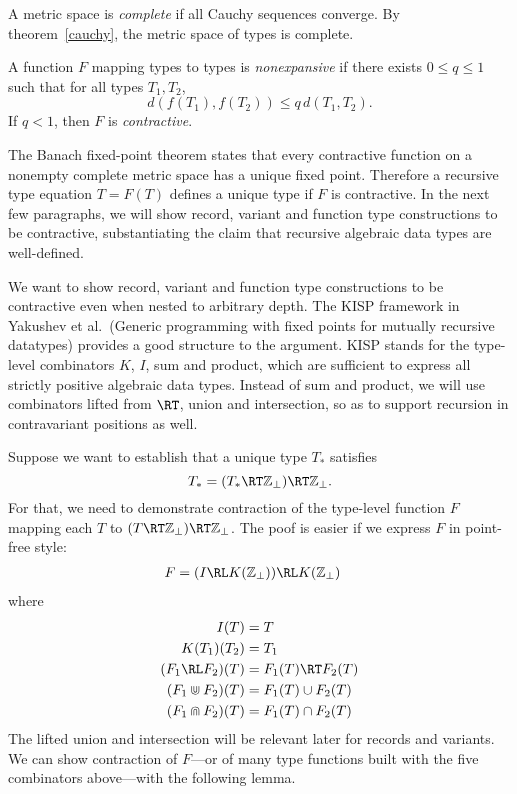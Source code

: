 \documentclass{amsart}
\begin{document}

A metric space is \emph{complete} if all Cauchy sequences
converge. By theorem~\ref{cauchy}, the metric space of types is
complete.

A function $F$ mapping types to types is \emph{nonexpansive} if
there exists $0\le q\le1$ such that for all types $T_1,T_2$,
\[
d(f(T_1), f(T_2)) \le q \, d(T_1, T_2).
\]
If $q<1$, then $F$ is \emph{contractive}.

The Banach fixed-point theorem states that every contractive
function on a nonempty complete metric space has a unique fixed
point. Therefore a recursive type equation $T=F(T)$ defines a
unique type if $F$ is contractive. In the next few paragraphs, we
will show record, variant and function type constructions to be
contractive, substantiating the claim that recursive algebraic
data types are well-defined.

\label{kisp}

We want to show record, variant and function type constructions
to be contractive even when nested to arbitrary depth. The KISP
framework in Yakushev et al.\ (Generic programming with fixed
points for mutually recursive datatypes) provides a good
structure to the argument. KISP stands for the type-level
combinators $K$, $I$, sum and product, which are sufficient to
express all strictly positive algebraic data types. Instead of
sum and product, we will use combinators lifted from $\RT$, union
and intersection, so as to support recursion in contravariant
positions as well.

Suppose we want to establish that a unique type $T_*$
satisfies
\[
T_*=(T_*\RT \mathbb Z_\bot)\RT \mathbb Z_\bot.
\]
For that, we need to demonstrate contraction of the type-level
function $F$ mapping each $T$ to $(T \RT \mathbb Z_\bot)\RT
\mathbb Z_\bot$. The poof is easier if we express $F$ in
point-free style:
\begin{align*}
F &= (I \RL K(\mathbb Z_\bot)) \RL K(\mathbb Z_\bot)
\end{align*}
where
\begin{align*}
I(T) &= T \\
K(T_1)(T_2) &= T_1 \\
(F_1 \RL F_2)(T) &= F_1(T) \RT F_2(T)\\
(F_1 \Cup F_2)(T) &= F_1(T) \cup F_2(T)\\
(F_1 \Cap F_2)(T) &= F_1(T) \cap F_2(T)
\end{align*}
The lifted union and intersection will be relevant later for
records and variants. We can show contraction of $F$---or of many
type functions built with the five combinators above---with the
following lemma.
\end{document}
